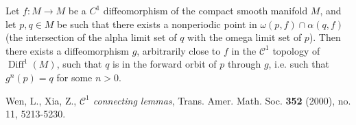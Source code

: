 \documentclass[12pt]{article}
\begin{document}
Let $f\colon M\to M$ be a $C^1$ diffeomorphism of the compact smooth manifold $M$, and let $p,q\in M$ be such that there exists a nonperiodic point in $\omega(p,f)\cap \alpha(q,f)$ (the intersection of the alpha limit set of $q$ with the omega limit set of $p$). Then there exists a diffeomorphism $g$, arbitrarily close to $f$ in the $\mathcal{C}^1$ topology of $\operatorname{Diff}^1(M)$, such that $q$ is in the forward orbit of $p$ through $g$, i.e. such that $g^n(p)=q$ for some $n>0$.

\begin{thebibliography}{9}
 Wen, L., Xia, Z., \emph{$\mathcal{C}^1$ connecting lemmas}, Trans. Amer. Math. Soc. \textbf{352} (2000), no. 11, 5213-5230.
\end{thebibliography}
\end{document}
